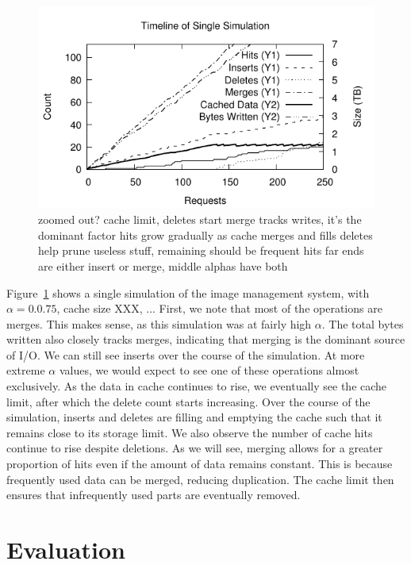 \documentclass[sigconf]{acmart}
\begin{document}
\begin{figure}
\includegraphics[width=\linewidth]{curated/time-series/time-series.pdf}
\label{fig:series}
zoomed out?
cache limit, deletes start
merge tracks writes, it's the dominant factor
hits grow gradually as cache merges and fills
deletes help prune useless stuff, remaining should be frequent hits
far ends are either insert or merge, middle alphas have both
\fi
\end{figure}

Figure~\ref{fig:series} shows a single simulation of the image management system,
with $\alpha=0.0.75$, cache size XXX, ...
First, we note that most of the operations are merges.
This makes sense, as this simulation was at fairly high $\alpha$.
The total bytes written also closely tracks merges,
indicating that merging is the dominant source of I/O.
We can still see inserts over the course of the simulation.
At more extreme $\alpha$ values,
we would expect to see one of these operations almost exclusively.
As the data in cache continues to rise,
we eventually see the cache limit,
after which the delete count starts increasing.
Over the course of the simulation,
inserts and deletes are filling and emptying the cache such that it remains close to its storage limit.
We also observe the number of cache hits continue to rise despite deletions.
As we will see, merging allows for a greater proportion of hits even if the amount of data remains constant.
This is because frequently used data can be merged,
reducing duplication.
The cache limit then ensures that infrequently used parts are eventually removed.

\section{Evaluation}
\end{document}
